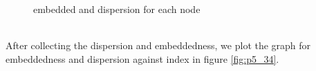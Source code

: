 \documentclass{article}
\begin{document}
\begin{figure}[htbp]
\centering
{}
\caption{embedded and dispersion for each node}
\label{fig:p5_1_2}
\end{figure}
\\
After collecting the dispersion and embeddedness, we plot the graph for embeddedness and dispersion against index in figure \ref{fig:p5_34}.\\
\end{document}
